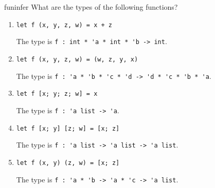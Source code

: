 %
\begin{exercise}{funinfer}
What are the types of the following functions?

\begin{enumerate}
\item \lstinline!let f (x, y, z, w) = x + z!

\begin{answer}\ifanswers
The type is \hbox{\lstinline/f : int * 'a * int * 'b -> int/}.
\fi\end{answer}

\item \lstinline!let f (x, y, z, w) = (w, z, y, x)!

\begin{answer}\ifanswers
The type is \hbox{\lstinline/f : 'a * 'b * 'c * 'd -> 'd * 'c * 'b * 'a/}.
\fi\end{answer}

\item \lstinline!let f [x; y; z; w] = x!

\begin{answer}\ifanswers
The type is \hbox{\lstinline/f : 'a list -> 'a/}.
\fi\end{answer}

\item \lstinline!let f [x; y] [z; w] = [x; z]!

\begin{answer}\ifanswers
The type is \hbox{\lstinline/f : 'a list -> 'a list -> 'a list/}.
\fi\end{answer}

\item \lstinline!let f (x, y) (z, w) = [x; z]!

\begin{answer}\ifanswers
The type is \hbox{\lstinline/f : 'a * 'b -> 'a * 'c -> 'a list/}.
\fi\end{answer}
\end{enumerate}
\end{exercise}

